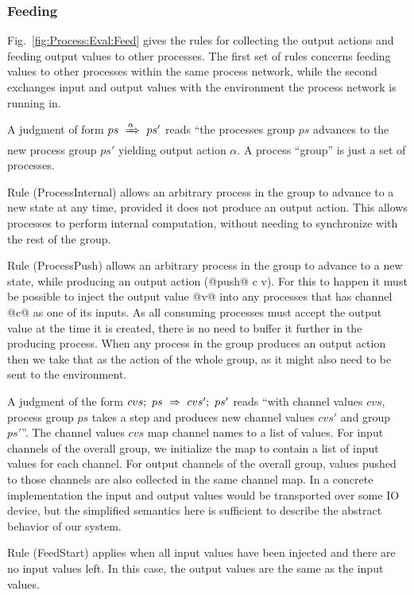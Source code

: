 \subsubsection{Feeding}
Fig.~\ref{fig:Process:Eval:Feed} gives the rules for collecting the output actions and feeding output values to other processes. The first set of rules concerns feeding values to other processes within the same process network, while the second exchanges input and output values with the environment the process network is running in.

\eject{}
A judgment of form $ps~\xRightarrow{\alpha}~ps'$ reads ``the processes group $ps$ advances to the new process group $ps'$ yielding output action $\alpha$. A process ``group'' is just a set of processes. 

Rule (ProcessInternal) allows an arbitrary process in the group to advance to a new state at any time, provided it does not produce an output action. This allows processes to perform internal computation, without needing to synchronize with the rest of the group.

Rule (ProcessPush) allows an arbitrary process in the group to advance to a new state, while producing an output action (@push@ c v). For this to happen it must be possible to inject the output value @v@ into any processes that has channel @c@ as one of its inputs. As all consuming processes must accept the output value at the time it is created, there is no need to buffer it further in the producing process. When any process in the group produces an output action then we take that as the action of the whole group, as it might also need to be sent to the environment. 

\smallskip

A judgment of the form $cvs;~ps~\Rightarrow~cvs';~ps'$ reads ``with channel values $cvs$, process group $ps$ takes a step and produces new channel values $cvs'$ and group $ps'$''. The channel values $cvs$ map channel names to a list of values. For input channels of the overall group, we initialize the map to contain a list of input values for each channel. For output channels of the overall group, values pushed to those channels are also collected in the same channel map. In a concrete implementation the input and output values would be transported over some IO device, but the simplified semantics here is sufficient to describe the abstract behavior of our system.

Rule (FeedStart) applies when all input values have been injected and there are no input values left.
In this case, the output values are the same as the input values.

